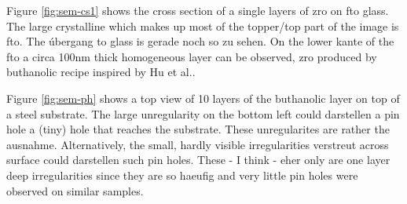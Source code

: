 Figure \ref{fig:sem-cs1} shows the cross section of a single layers of \gls{zro} on \gls{fto} glass. 
The large crystalline  which makes up most of the topper/top part of the image is \gls{fto}. 
The úbergang to glass is gerade noch so zu sehen. 
On the lower kante of the \gls{fto} a circa 100nm thick homogeneous layer can be observed, \gls{zro} produced by buthanolic recipe inspired by Hu et al..

Figure \ref{fig:sem-ph} shows a top view of 10 layers of the buthanolic layer on top of a steel substrate. 
The large unregularity on the bottom left could darstellen a pin hole a (tiny) hole that reaches the substrate. 
These unregularites are rather the ausnahme. 
Alternatively, the small, hardly visible  irregularities verstreut across surface could darstellen such pin holes. 
These - I think - eher only are one layer deep irregularities since they are so haeufig 
and very little pin holes were observed on similar samples. 




